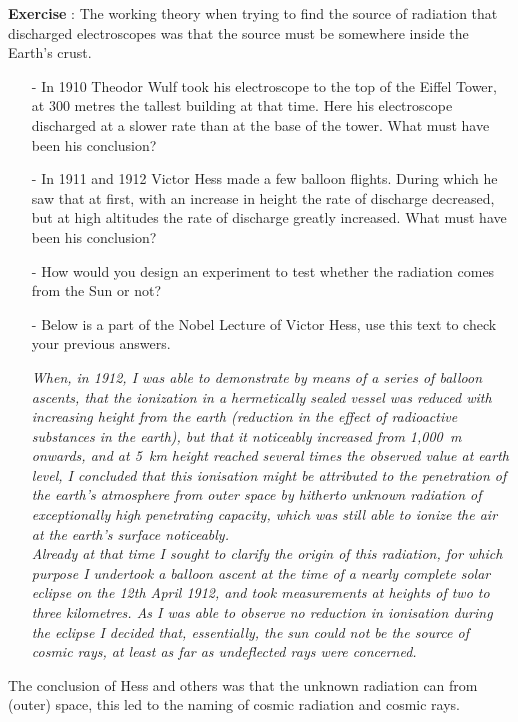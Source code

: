 \documentclass[12pt,a4paper]{article}
\numberwithin{equation}{section}
\numberwithin{figure}{section}
\newcounter{Exercise}
\numberwithin{table}{section}
\begin{document}
\begin{shaded}
\textbf{Exercise \theExercise {}} : The working theory when trying to find the source of radiation that discharged electroscopes was that the source must be somewhere inside the Earth's crust.
\begin{itemize}
\item[-] In 1910 Theodor Wulf took his electroscope to the top of the Eiffel Tower, at 300 metres the tallest building at that time. Here his electroscope discharged at a slower rate than at the base of the tower. What must have been his conclusion?
\item[-] In 1911 and 1912 Victor Hess made a few balloon flights. During which he saw that at first, with an increase in height the rate of discharge decreased, but at high altitudes the rate of discharge greatly increased. What must have been his conclusion? 
\item[-] How would you design an experiment to test whether the radiation comes from the Sun or not?
\item[-] Below is a part of the Nobel Lecture of Victor Hess, use this text to 	check your previous answers.

\textit{When, in 1912, I was able to demonstrate by means of a series of balloon ascents, that the ionization in a hermetically sealed vessel was reduced with increasing height from the earth (reduction in the effect of radioactive substances in the earth), but that it noticeably increased from 1,000~m onwards, and at 5~km height reached several times the observed value at earth level, I concluded that this ionisation might be attributed to the penetration of the earth's atmosphere from outer space by hitherto unknown radiation of exceptionally high penetrating capacity, which was still able to ionize the air at the earth's surface noticeably. \\
Already at that time I sought to clarify the origin of this radiation, for which purpose I undertook a balloon ascent at the time of a nearly complete solar eclipse on the 12th April 1912, and took measurements at heights of two to three kilometres. As I was able to observe no reduction in ionisation during the eclipse I decided that, essentially, the sun could not be the source of cosmic rays, at least as far as undeflected rays were concerned.}
\end{itemize} \end{shaded}

The conclusion of Hess and others was that the unknown radiation can from (outer) space, this led to the naming of cosmic radiation and cosmic rays.
\end{document}
